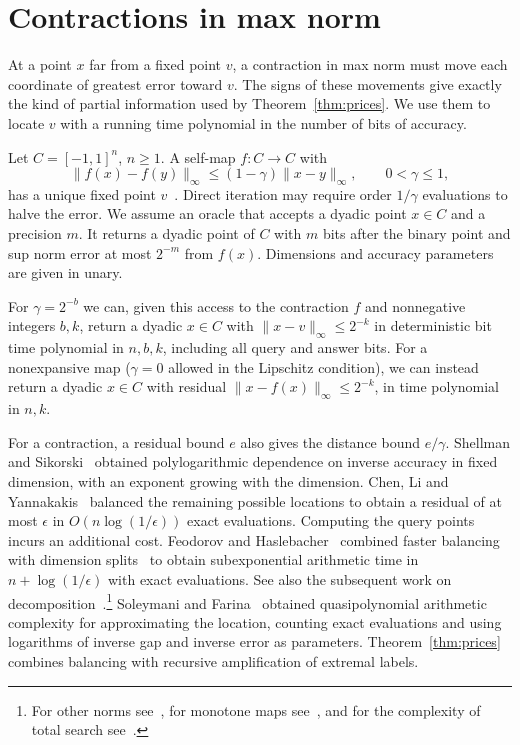 \section{Contractions in max norm}\label{sec:contractions}

At a point \(x\) far from a fixed point \(v\), a contraction in max
norm must move each coordinate of greatest error toward \(v\).
The signs of these movements give exactly the kind of partial
information used by Theorem~\ref{thm:prices}. We use them to locate
\(v\) with a running time polynomial in the number of bits of accuracy.

Let \(C=[-1,1]^n\), \(n\ge1\). A self-map \(f:C\to C\) with
\[
 \|f(x)-f(y)\|_\infty\le (1-\gamma)\|x-y\|_\infty,\qquad
 0<\gamma\le1,
\]
has a unique fixed point \(v\)~\cite{Ban}. Direct iteration may
require order \(1/\gamma\) evaluations to halve the error.
We assume an oracle that accepts a dyadic point \(x\in C\) and a
precision \(m\). It returns a dyadic point of \(C\) with \(m\) bits
after the binary point and sup norm error at most \(2^{-m}\) from
\(f(x)\). Dimensions and accuracy parameters are given in unary.

\begin{theorem}\label{thm:contraction}
For \(\gamma=2^{-b}\)
we can, given this access to the contraction \(f\)
and nonnegative integers \(b,k\), return
a dyadic \(x\in C\) with \(\|x-v\|_\infty\le 2^{-k}\)
in deterministic bit time polynomial in \(n,b,k\),
including all query and answer bits.
For a nonexpansive map (\(\gamma=0\) allowed
in the Lipschitz condition), we can instead return a dyadic \(x\in C\)
with residual
\(\|x-f(x)\|_\infty\le 2^{-k}\),
in time polynomial in \(n,k\).
\end{theorem}

For a contraction, a residual bound \(e\) also gives the distance
bound \(e/\gamma\). Shellman and Sikorski~\cite{Sik} obtained
polylogarithmic dependence on inverse accuracy in fixed dimension,
with an exponent growing with the dimension. Chen, Li and
Yannakakis~\cite{CLY} balanced the remaining possible locations to
obtain a residual of at most \(\epsilon\) in
\(O(n\log(1/\epsilon))\) exact evaluations. Computing the query
points incurs an additional cost. Feodorov and Haslebacher~\cite{FH}
combined faster balancing with dimension splits~\cite{CLYsp}
to obtain subexponential arithmetic time in \(n+\log(1/\epsilon)\)
with exact evaluations. See also the subsequent work on
decomposition~\cite{CLYdec}.\footnote{For other norms see~\cite{STWon,HKS,HLSW,DFZ},
for monotone maps see~\cite{BFGMS}, and for the complexity of total
search see~\cite{DP,FGMS}.} Soleymani and Farina~\cite{SF} obtained
quasipolynomial arithmetic complexity for approximating the location,
counting exact evaluations and using logarithms of inverse gap and
inverse error as parameters. Theorem~\ref{thm:prices} combines
balancing with recursive amplification of extremal labels.

